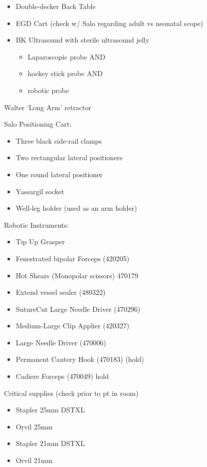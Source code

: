 \documentclass[
  letterpaper,
]{scrbook}
\providecommand{\tightlist}{%
  \setlength{\itemsep}{0pt}\setlength{\parskip}{0pt}}
\begin{document}
\begin{itemize}
\tightlist
\item
  Double-decker Back Table
\item
  EGD Cart (check w/ Salo regarding adult vs neonatal scope)
\item
  BK Ultrasound with sterile ultrasound jelly

  \begin{itemize}
  \tightlist
  \item
    Laparoscopic probe AND
  \item
    hockey stick probe AND
  \item
    robotic probe
  \end{itemize}
\end{itemize}

Walter `Long Arm' retractor

Salo Positioning Cart:

\begin{itemize}
\tightlist
\item
  Three black side-rail clamps
\item
  Two rectangular lateral positioners
\item
  One round lateral positioner
\item
  Yassargil socket
\item
  Well-leg holder (used as an arm holder)
\end{itemize}

Robotic Instruments:

\begin{itemize}
\tightlist
\item
  Tip Up Grasper
\item
  Fenestrated bipolar Forceps (420205)
\item
  Hot Shears (Monopolar scissors) 470179
\item
  Extend vessel sealer (480322)
\item
  SutureCut Large Needle Driver (470296)
\item
  Medium-Large Clip Applier (420327)
\item
  Large Needle Driver (470006)
\item
  Permanent Cautery Hook (470183) (hold)
\item
  Cadiere Forceps (470049) hold
\end{itemize}

Critical supplies (check prior to pt in room)

\begin{itemize}
\tightlist
\item
  Stapler 25mm DSTXL
\item
  Orvil 25mm
\item
  Stapler 21mm DSTXL
\item
  Orvil 21mm
\end{itemize}
\end{document}
